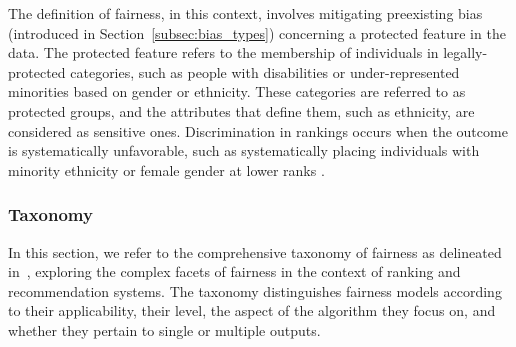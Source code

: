 The definition of fairness, in this context, involves mitigating preexisting bias (introduced in Section~\ref{subsec:bias_types}) concerning a protected feature in the data. The protected feature refers to the membership of individuals in legally-protected categories, such as people with disabilities or under-represented minorities based on gender or ethnicity. These categories are referred to as protected groups, and the attributes that define them, such as ethnicity, are considered as sensitive ones. Discrimination in rankings occurs when the outcome is systematically unfavorable, such as systematically placing individuals with minority ethnicity or female gender at lower ranks \cite{asudeh2019designing}.


\subsubsection{Taxonomy}
\label{subsec:fairness_tax}

In this section, we refer to the comprehensive taxonomy of fairness as delineated in~\cite{pitoura2022fairness}, exploring the complex facets of fairness in the context of ranking and recommendation systems. The taxonomy 
distinguishes fairness models according to their applicability, their level, the aspect of the algorithm they focus on, and whether they pertain to single or multiple outputs.




